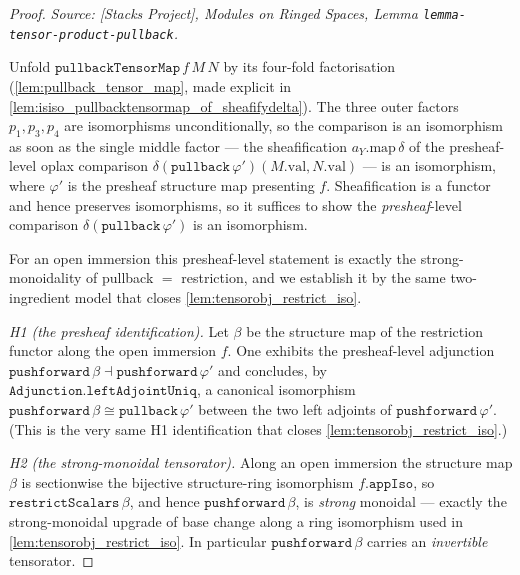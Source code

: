 \begin{proof}
  \leanok
  \textit{Source: [Stacks Project], Modules on Ringed Spaces, Lemma
  \texttt{lemma-tensor-product-pullback}.}

  Unfold \(\mathtt{pullbackTensorMap}\,f\,M\,N\) by its four-fold factorisation
  (\cref{lem:pullback_tensor_map}, made explicit in
  \cref{lem:isiso_pullbacktensormap_of_sheafifydelta}). The three outer factors
  \(p_1, p_3, p_4\) are isomorphisms unconditionally, so the comparison is an isomorphism as
  soon as the single middle factor --- the sheafification \(a_Y.\mathrm{map}\,\delta\) of the
  presheaf-level oplax comparison
  \(\delta(\mathtt{pullback}\,\varphi')(M.\mathrm{val}, N.\mathrm{val})\) --- is an
  isomorphism, where \(\varphi'\) is the presheaf structure map presenting \(f\).
  Sheafification is a functor and hence preserves isomorphisms, so it suffices to show the
  \emph{presheaf}-level comparison \(\delta(\mathtt{pullback}\,\varphi')\) is an isomorphism.

  For an open immersion this presheaf-level statement is exactly the strong-monoidality of
  pullback \(=\) restriction, and we establish it by the same two-ingredient model that
  closes \cref{lem:tensorobj_restrict_iso}.

  \emph{H1 (the presheaf identification).} Let \(\beta\) be the structure map of the
  restriction functor along the open immersion \(f\). One exhibits the presheaf-level
  adjunction \(\mathtt{pushforward}\,\beta \dashv \mathtt{pushforward}\,\varphi'\) and
  concludes, by \(\mathtt{Adjunction.leftAdjointUniq}\), a canonical isomorphism
  \(\mathtt{pushforward}\,\beta \cong \mathtt{pullback}\,\varphi'\) between the two left
  adjoints of \(\mathtt{pushforward}\,\varphi'\). (This is the very same H1 identification
  that closes \cref{lem:tensorobj_restrict_iso}.)

  \emph{H2 (the strong-monoidal tensorator).} Along an open immersion the structure map
  \(\beta\) is sectionwise the bijective structure-ring isomorphism \(f.\mathtt{appIso}\), so
  \(\mathtt{restrictScalars}\,\beta\), and hence \(\mathtt{pushforward}\,\beta\), is
  \emph{strong} monoidal --- exactly the strong-monoidal upgrade of base change along a ring
  isomorphism used in \cref{lem:tensorobj_restrict_iso}. In particular
  \(\mathtt{pushforward}\,\beta\) carries an \emph{invertible} tensorator.


\end{proof}
